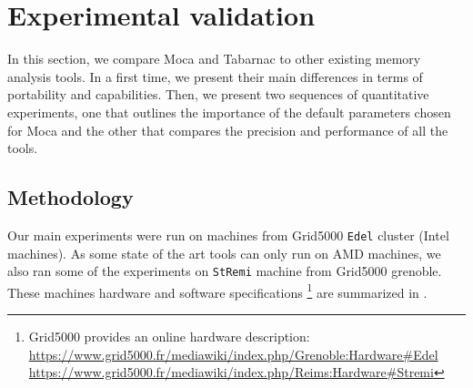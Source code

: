 
\section{Experimental validation}
\label{sec:moca-expe}

In this section, we compare \gls{Moca} and \gls{Tabarnac} to other existing memory analysis tools.
In a first time, we present their main differences in terms of portability and capabilities.
Then, we present two sequences of quantitative experiments, one that outlines the importance of the default parameters chosen for \gls{Moca} and the other that compares the precision and performance of all the tools.

\subsection{Methodology}

Our main experiments were run on  machines from \gls{Grid5000} \texttt{Edel}
cluster (Intel machines).
As some state of the art tools can only run on \gls{AMD} machines, we also ran
    some of the experiments on
    \texttt{StRemi} machine from \gls{Grid5000} grenoble.
    These machines hardware and software specifications%
    \footnote{\gls{Grid5000} provides an online hardware description:\\
       \url{https://www.grid5000.fr/mediawiki/index.php/Grenoble:Hardware\#Edel}
       \\\url{https://www.grid5000.fr/mediawiki/index.php/Reims:Hardware\#Stremi}}
    are summarized in .

